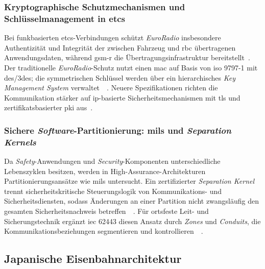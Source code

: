 \documentclass[runningheads]{res/llncs}
\begin{document}
\subsubsection{\texorpdfstring{Kryptographische Schutzmechanismen und Schlüsselmanagement in \gls{etcs}}{Kryptographische Schutzmechanismen und Schlüsselmanagement in ETCS}}
\label{sec:Kryptographische_Schutzmechanismen_und_Schlüsselmanagement_in_ETCS}
Bei funkbasierten \gls{etcs}-Verbindungen schützt \textit{EuroRadio} insbesondere Authentizität und Integrität der zwischen Fahrzeug und \gls{rbc} übertragenen Anwendungsdaten, während \gls{gsm-r} die Übertragungsinfrastruktur bereitstellt~\parencite[S. 744, 751]{chothiaAttack2017}. Der traditionelle \textit{EuroRadio}-Schutz nutzt einen \gls{mac} auf Basis von \gls{iso} 9797-1 mit \gls{des}/\gls{3des}; die symmetrischen Schlüssel werden über ein hierarchisches \textit{Key Management System} verwaltet~\parencite[S. 751]{chothiaAttack2017}~\parencite[S. 90, 100]{trinckaufETCS2024}. Neuere Spezifikationen richten die Kommunikation stärker auf \gls{ip}-basierte Sicherheitsmechanismen mit \gls{tls} und zertifikatsbasierter \gls{pki} aus~\parencite[S. 105, 211]{trinckaufETCS2024}.

\subsubsection{\texorpdfstring{Sichere \textit{Software}-Partitionierung: \gls{mils} und \textit{Separation Kernels}}{Sichere Software-Partitionierung: MILS und Separation Kernels}}
\label{sec:Sichere_Software-Partitionierung_MILS_und_Separation_Kernels}
Da \textit{Safety}-Anwendungen und \textit{Security}-Komponenten unterschiedliche Lebenszyklen besitzen, werden in High-Assurance-Architekturen Partitionierungsansätze wie \gls{mils} untersucht. Ein zertifizierter \textit{Separation Kernel} trennt sicherheitskritische Steuerungslogik von Kommunikations- und Sicherheitsdiensten, sodass Änderungen an einer Partition nicht zwangsläufig den gesamten Sicherheitsnachweis betreffen~\parencite[S. 31--35]{schulzIntegration2019}~\parencite[S. 80--83]{tverdyshevCertMILS2019}. Für ortsfeste Leit- und Sicherungstechnik ergänzt \gls{iec} 62443 diesen Ansatz durch \textit{Zones} und \textit{Conduits}, die Kommunikationsbeziehungen segmentieren und kontrollieren~\parencite[S. 33]{schulzIntegration2019}~\parencite[S. 43]{h.tsukisawaStandardization2024}.

\subsection{Japanische Eisenbahnarchitektur}
\label{sec:Japanische_Eisenbahnarchitektur}
\end{document}
